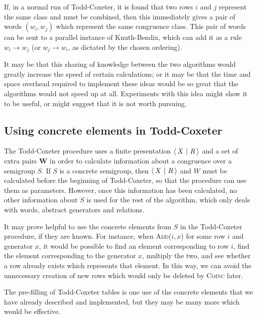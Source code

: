 If, in a normal run of Todd-Coxeter, it is found that two rows $i$ and $j$
represent the same class and must be combined, then this immediately gives a
pair of words $(w_i,w_j)$ which represent the same congruence class.  This pair
of words can be sent to a parallel instance of Knuth-Bendix, which can add it as
a rule $w_i \to w_j$ (or $w_j \to w_i$, as dictated by the chosen ordering).

It may be that this sharing of knowledge between the two algorithms would
greatly increase the speed of certain calculations; or it may be that the time
and space overhead required to implement these ideas would be so great that the
algorithms would not speed up at all.  Experiments with this idea might show it
to be useful, or might suggest that it is not worth pursuing.

\subsection{Using concrete elements in Todd-Coxeter}
\label{sec:tc-concrete-elms}
The Todd-Coxeter procedure uses a finite presentation $\left\langle\,X ~\middle|~ R\,\right\rangle$ and a set of
extra pairs $\mathbf{W}$ in order to calculate information about a congruence
over a semigroup $S$.  If $S$ is a concrete semigroup, then $\left\langle\,X ~\middle|~ R\,\right\rangle$ and $W$
must be calculated before the beginning of Todd-Coxeter, so that the procedure
can use them as parameters.  However, once this information has been calculated,
no other information about $S$ is used for the rest of the algorithm, which only
deals with words, abstract generators and relations.

It may prove helpful to use the concrete elements from $S$ in the Todd-Coxeter
procedure, if they are known.  For instance, when \textsc{Add($i, x$)} for some
row $i$ and generator $x$, it would be possible to find an element corresponding
to row $i$, find the element corresponding to the generator $x$, multiply the
two, and see whether a row already exists which represents that element.  In
this way, we can avoid the unnecessary creation of new rows which would only be
deleted by \textsc{Coinc} later.

The pre-filling of Todd-Coxeter tables is one use of the concrete elements that
we have already described and implemented, but they may be many more which would
be effective.

